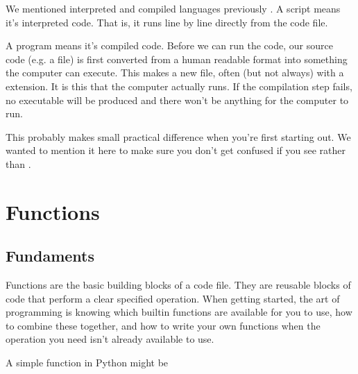\documentclass[letterpaper,10pt,british]{sphinxmanual}
\begin{document}
\sphinxAtStartPar
We mentioned interpreted and compiled languages previously {\hyperref[\detokenize{chapters/motivation/language_types:language-types}]{}}. A script means it’s interpreted code. That is, it runs line by line directly from the code file.

\sphinxAtStartPar
A program means it’s compiled code. Before we can run the code, our source code (e.g. a  file) is first converted from a human readable format into something the computer can execute. This makes a new file, often (but not always) with a  extension. It is this  that the computer actually runs. If the compilation step fails, no executable will be produced and there won’t be anything for the computer to run.

\sphinxAtStartPar
This probably makes small practical difference when you’re first starting out. We wanted to mention it here to make sure you don’t get confused if you see  rather than .

\sphinxstepscope


\section{Functions}
\label{\detokenize{chapters/programming_fundamentals/functions:functions}}\label{\detokenize{chapters/programming_fundamentals/functions:id1}}\label{\detokenize{chapters/programming_fundamentals/functions::doc}}

\subsection{Fundaments}
\label{\detokenize{chapters/programming_fundamentals/functions:fundaments}}
\sphinxAtStartPar
Functions are the basic building blocks of a code file. They are re\sphinxhyphen{}usable blocks of code that perform a clear specified operation. When getting started, the art of programming is knowing which built\sphinxhyphen{}in functions are available for you to use, how to combine these together, and how to write your own functions when the operation you need isn’t already available to use.

\sphinxAtStartPar
A simple function in Python might be

\begin{sphinxVerbatim}[commandchars=\\\{\}]
 
          
     
\end{sphinxVerbatim}
\end{document}
